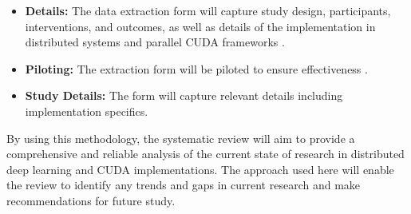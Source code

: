 
\begin{itemize}
    \item \textbf{Details:} The data extraction form will capture study design, participants, interventions, and outcomes, as well as details of the implementation in distributed systems and parallel CUDA frameworks \cite{ben-nun_demystifying_2020}.
    \item \textbf{Piloting:} The extraction form will be piloted to ensure effectiveness \cite{ben-nun_demystifying_2020}.
    \item \textbf{Study Details:} The form will capture relevant details including implementation specifics.
\end{itemize}

By using this methodology, the systematic review will aim to provide a comprehensive and reliable 
analysis of the current state of research in distributed deep learning and CUDA implementations. 
The approach used here will enable the review to identify any trends and gaps in current research 
and make recommendations for future study.


